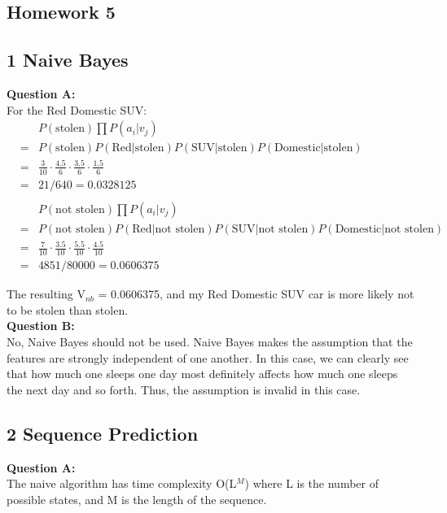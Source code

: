 \documentclass[12 pt]{article}
\begin{document}
	\begin{center}
		\section*{Homework 5}
	\end{center}
	
	
	\subsection*{1 Naive Bayes}	
	\textbf{Question A:}  \\
	For the Red Domestic SUV: \\
	
	\noindent \begin{eqnarray*}
	&& P(\text{stolen}) \prod P(a_i | v_j) \\
	&=& P(\text{stolen}) P(\text{Red}|\text{stolen}) P(\text{SUV}|\text{stolen}) P(\text{Domestic}|\text{stolen}) \\
	&=& \frac{3}{10}  \cdot \frac{4.5}{6}\cdot \frac {3.5}{6} \cdot \frac {1.5}{6}   \\
	&=& 21/640 = 0.0328125\\
	\\
	&& P(\text{not stolen}) \prod P(a_i | v_j) \\
	&=& P(\text{not stolen}) P(\text{Red}|\text{not stolen}) P(\text{SUV}|\text{not stolen}) P(\text{Domestic}|\text{not stolen}) \\
	&=& \frac{7}{10}  \cdot \frac{3.5}{10}\cdot \frac {5.5}{10} \cdot \frac {4.5}{10}   \\
	&=& 4851/80000 = 0.0606375
	\end{eqnarray*} 

	\noindent The resulting V$_{nb}$ = 0.0606375, and my Red Domestic SUV car is more likely not to be stolen than stolen. \\

	\noindent\textbf{Question B:}  \\
	No, Naive Bayes should not be used. Naive Bayes makes the assumption that the features are strongly independent of one another. In this case, we can clearly see that how much one sleeps one day most definitely affects how much one sleeps the next day and so forth. Thus, the assumption is invalid in this case.
 
	
	\subsection*{2 Sequence Prediction}
	\noindent\textbf{Question A:} \\
	The naive algorithm has time complexity O(L$^M$) where L is the number of possible states, and M is the length of the sequence.\\
	
\end{document}
